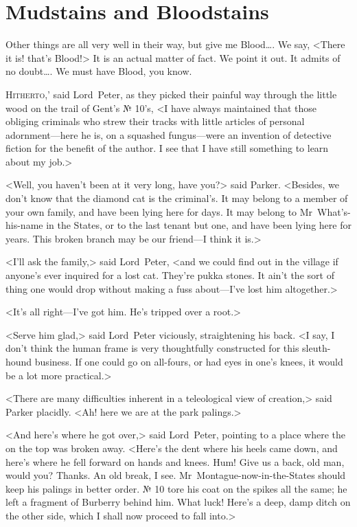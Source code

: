 \chapter{Mudstains and Bloodstains}

\epigraph{Other things are all very well in their way, but give me Blood\dots . We say, <There it is! that's Blood!> It is an actual matter of fact. We point it out. It admits of no doubt\dots . We must have Blood, you know.}{}


\lettrine[ante=`]{H}{itherto,}' said Lord~Peter, as they picked their painful way through the little wood on the trail of Gent's № 10's, <I have always maintained that those obliging criminals who strew their tracks with little articles of personal adornment—here he is, on a squashed fungus—were an invention of detective fiction for the benefit of the author. I see that I have still something to learn about my job.>

<Well, you haven't been at it very long, have you?> said Parker.  <Besides, we don't know that the diamond cat is the criminal's. It may belong to a member of your own family, and have been lying here for days. It may belong to Mr~What's-his-name in the States, or to the last tenant but one, and have been lying here for years. This broken branch may be our friend—I think it is.>

<I'll ask the family,> said Lord~Peter, <and we could find out in the village if anyone's ever inquired for a lost cat. They're pukka stones. It ain't the sort of thing one would drop without making a fuss about—I've lost him altogether.>

<It's all right—I've got him. He's tripped over a root.>

<Serve him glad,> said Lord~Peter viciously, straightening his back.  <I say, I don't think the human frame is very thoughtfully constructed for this sleuth-hound business. If one could go on all-fours, or had eyes in one's knees, it would be a lot more practical.>

<There are many difficulties inherent in a teleological view of creation,> said Parker placidly. <Ah! here we are at the park palings.>

<And here's where he got over,> said Lord~Peter, pointing to a place where the  on the top was broken away. <Here's the dent where his heels came down, and here's where he fell forward on hands and knees. Hum! Give us a back, old man, would you? Thanks.  An old break, I see. Mr~Montague-now-in-the-States should keep his palings in better order. № 10 tore his coat on the spikes all the same; he left a fragment of Burberry behind him. What luck! Here's a deep, damp ditch on the other side, which I shall now proceed to fall into.>

